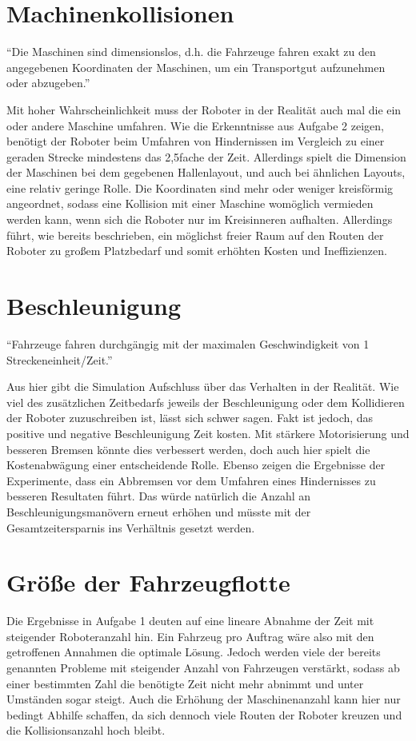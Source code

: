 \documentclass[ngerman]{tudscrreprt}
\begin{document}
\section{Machinenkollisionen}
\begin{displayquote}
    ``Die Maschinen sind dimensionslos, d.h. die Fahrzeuge fahren exakt zu den angegebenen Koordinaten der Maschinen, um ein Transportgut aufzunehmen oder abzugeben.'' \cite{aufgabenstellung}
\end{displayquote}
%
Mit hoher Wahrscheinlichkeit muss der Roboter in der Realität auch mal die ein oder andere Maschine umfahren. Wie die Erkenntnisse aus Aufgabe 2 zeigen, benötigt der Roboter beim Umfahren von Hindernissen im Vergleich zu einer geraden Strecke mindestens das 2,5fache der Zeit. Allerdings spielt die Dimension der Maschinen bei dem gegebenen Hallenlayout, und auch bei ähnlichen Layouts, eine relativ geringe Rolle. Die Koordinaten sind mehr oder weniger kreisförmig angeordnet, sodass eine Kollision mit einer Maschine womöglich vermieden werden kann, wenn sich die Roboter nur im Kreisinneren aufhalten. Allerdings führt, wie bereits beschrieben, ein möglichst freier Raum auf den Routen der Roboter zu großem Platzbedarf und somit erhöhten Kosten und Ineffizienzen.

\section{Beschleunigung}
\begin{displayquote}
    ``Fahrzeuge fahren durchgängig mit der maximalen Geschwindigkeit von 1 Streckeneinheit/Zeit.'' \cite{aufgabenstellung}
\end{displayquote}
%
Aus hier gibt die Simulation Aufschluss über das Verhalten in der Realität. Wie viel des zusätzlichen Zeitbedarfs jeweils der Beschleunigung oder dem Kollidieren der Roboter zuzuschreiben ist, lässt sich schwer sagen. Fakt ist jedoch, das positive und negative Beschleunigung Zeit kosten. Mit stärkere Motorisierung und besseren Bremsen könnte dies verbessert werden, doch auch hier spielt die Kostenabwägung einer entscheidende Rolle. Ebenso zeigen die Ergebnisse der Experimente, dass ein Abbremsen vor dem Umfahren eines Hindernisses zu besseren Resultaten führt. Das würde natürlich die Anzahl an Beschleunigungsmanövern erneut erhöhen und müsste mit der Gesamtzeitersparnis ins Verhältnis gesetzt werden.

\section{Größe der Fahrzeugflotte}
Die Ergebnisse in Aufgabe 1 deuten auf eine lineare Abnahme der Zeit mit steigender Roboteranzahl hin. Ein Fahrzeug pro Auftrag wäre also mit den getroffenen Annahmen die optimale Lösung. Jedoch werden viele der bereits genannten Probleme mit steigender Anzahl von Fahrzeugen verstärkt, sodass ab einer bestimmten Zahl die benötigte Zeit nicht mehr abnimmt und unter Umständen sogar steigt. Auch die Erhöhung der Maschinenanzahl kann hier nur bedingt Abhilfe schaffen, da sich dennoch viele Routen der Roboter kreuzen und die Kollisionsanzahl hoch bleibt.



\end{document}
